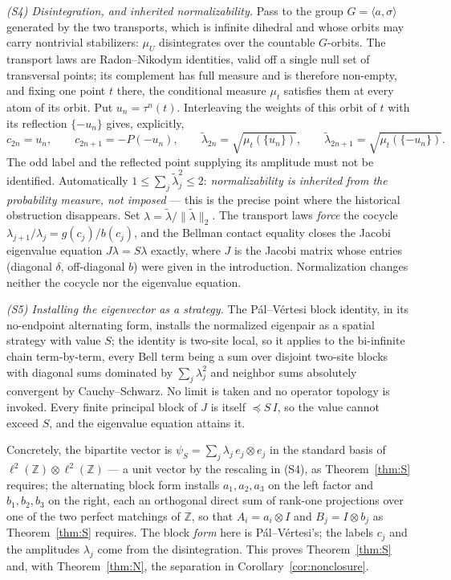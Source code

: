 \documentclass[11pt]{article}
\theoremstyle{remark}
\begin{document}
\emph{(S4) Disintegration, and inherited normalizability.} Pass to
the group $G=\langle a,\sigma\rangle$ generated by the two transports, which
is infinite dihedral and whose orbits may carry nontrivial stabilizers:
$\mu_U$ disintegrates over the countable $G$-orbits. The transport laws are
Radon--Nikodym identities, valid off a single null set of transversal points;
its complement has full measure and is therefore non-empty, and fixing one
point $t$ there, the conditional measure $\mu_t$ satisfies them at every atom
of its orbit. Put $u_n=\tau^n(t)$. Interleaving the weights of this orbit of
$t$ with its reflection $\{-u_n\}$ gives, explicitly,
\[
 c_{2n}=u_n,\qquad c_{2n+1}=-P(-u_n),\qquad
 \widetilde\lambda_{2n}=\sqrt{\mu_t(\{u_n\})},\qquad
 \widetilde\lambda_{2n+1}=\sqrt{\mu_t(\{-u_n\})}.
\]
The odd label and the reflected point supplying its amplitude must not be
identified. Automatically $1\le\sum_j\widetilde\lambda_j^2\le2$:
\emph{normalizability is inherited from the
probability measure, not imposed} --- this is the precise point where the
historical obstruction disappears. Set
$\lambda=\widetilde\lambda/\|\widetilde\lambda\|_2$.
The transport laws \emph{force}
the cocycle $\lambda_{j+1}/\lambda_j=g(c_j)/b(c_j)$, and the Bellman contact
equality closes the Jacobi eigenvalue equation $J\lambda=S\lambda$ exactly,
where $J$ is the Jacobi matrix whose entries (diagonal $\delta$,
off-diagonal $b$) were given in the introduction. Normalization changes
neither the cocycle nor the eigenvalue equation.

\emph{(S5) Installing the eigenvector as a strategy.}
The P\'al--V\'ertesi block identity, in its no-endpoint alternating form,
installs the normalized eigenpair as a spatial strategy with value $S$; the
identity is two-site local, so it applies to the bi-infinite chain
term-by-term, every Bell term being a sum over disjoint two-site blocks with
diagonal sums dominated by $\sum_j\lambda_j^2$ and neighbor sums absolutely
convergent by Cauchy--Schwarz. No limit is taken and no operator topology is
invoked. Every finite principal block of $J$ is itself $\preceq S\,I$, so the
value cannot exceed $S$, and the eigenvalue equation attains it.

Concretely, the bipartite vector is
$\psi_S=\sum_j\lambda_j\,e_j\otimes
e_j$ in the standard basis of
$\ell^2(\mathbb{Z})\otimes\ell^2(\mathbb{Z})$ --- a unit vector by the
rescaling in (S4), as
Theorem~\ref{thm:S} requires; the alternating block form installs
$a_1,a_2,a_3$ on the left factor and $b_1,b_2,b_3$ on the right, each an
orthogonal direct sum of rank-one projections over one of the two perfect
matchings of $\mathbb{Z}$, so that $A_i=a_i\otimes I$ and $B_j=I\otimes b_j$
as Theorem~\ref{thm:S} requires. The block \emph{form}
here is P\'al--V\'ertesi's; the labels $c_j$ and the amplitudes $\lambda_j$
come from the disintegration. This proves Theorem~\ref{thm:S} and, with
Theorem~\ref{thm:N}, the separation in Corollary~\ref{cor:nonclosure}.
\end{document}
